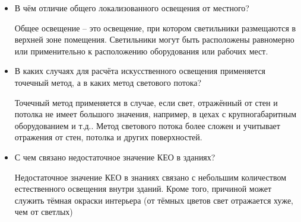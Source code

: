\documentclass[12pt]{article}
\begin{document}
\begin{itemize}
\item В чём отличие общего локализованного освещения от местного?

Общее освещение – это освещение, при котором светильники размещаются в верхней зоне помещения. Светильники могут быть расположены равномерно или применительно к расположению оборудования или рабочих мест.

\item В каких случаях для расчёта искусственного освещения применяется точечный метод, а в каких метод светового потока?

Точечный метод применяется в случае, если свет, отражённый от стен и потолка не имеет большого значения, например, в цехах с крупногабаритным оборудованием и т.д.. Метод светового потока более сложен и учитывает отражения от стен, потолка и других поверхностей. 

\item  С чем связано недостаточное значение КЕО в зданиях?

Недостаточное значение КЕО в знаниях связано с небольшим количеством естественного освещения внутри зданий. Кроме того, причиной может служить тёмная окраски интерьера (от тёмных цветов свет отражается хуже, чем от светлых)

\end{itemize}
\end{document}
